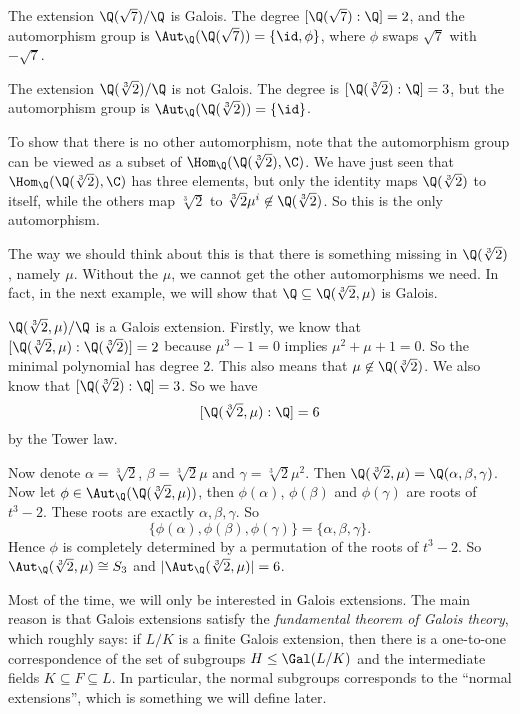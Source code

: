 \documentclass[a4paper]{article}
\begin{document}
\begin{eg}
  The extension $\Q(\sqrt{7})/\Q$ is Galois. The degree $[\Q(\sqrt{7}):\Q] = 2$, and the automorphism group is $\Aut_\Q(\Q(\sqrt{7})) = \{\id, \phi\}$, where $\phi$ swaps $\sqrt{7}$ with $-\sqrt{7}$.
\end{eg}

\begin{eg}
  The extension $\Q(\sqrt[3]{2})/\Q$ is not Galois. The degree is $[\Q(\sqrt[3]{2}):\Q] = 3$, but the automorphism group is $\Aut_\Q(\Q(\sqrt[3]{2})) = \{\id\}$.

  To show that there is no other automorphism, note that the automorphism group can be viewed as a subset of $\Hom_\Q(\Q(\sqrt[3]{2}), \C)$. We have just seen that $\Hom_\Q(\Q(\sqrt[3]{2}), \C)$ has three elements, but only the identity maps $\Q(\sqrt[3]{2})$ to itself, while the others map $\sqrt[3]{2}$ to $\sqrt[3]{2}\mu^i \not\in \Q(\sqrt[3]{2})$. So this is the only automorphism.

  The way we should think about this is that there is something missing in $\Q(\sqrt[3]{2})$, namely $\mu$. Without the $\mu$, we cannot get the other automorphisms we need. In fact, in the next example, we will show that $\Q\subseteq \Q(\sqrt[3]{2}, \mu)$ is Galois.
\end{eg}

\begin{eg}
  $\Q(\sqrt[3]{2},\mu)/\Q$ is a Galois extension. Firstly, we know that $[\Q(\sqrt[3]{2}, \mu): \Q(\sqrt[3]{2})] = 2$ because $\mu^3 - 1 = 0$ implies $\mu^2 + \mu + 1 = 0$. So the minimal polynomial has degree $2$. This also means that $\mu \not\in \Q(\sqrt[3]{2})$. We also know that $[\Q(\sqrt[3]{2}): \Q] = 3$. So we have
  \[
    [\Q(\sqrt[3]{2}, \mu): \Q] = 6
  \]
  by the Tower law.

  Now denote $\alpha = \sqrt[3]{2}$, $\beta = \sqrt[3]{2}\mu$ and $\gamma = \sqrt[3]{2}\mu^2$. Then $\Q(\sqrt[3]{2}, \mu) = \Q(\alpha, \beta, \gamma)$. Now let $\phi \in \Aut_\Q(\Q(\sqrt[3]{2}, \mu))$, then $\phi(\alpha)$, $\phi(\beta)$ and $\phi(\gamma)$ are roots of $t^3 - 2$. These roots are exactly $\alpha, \beta, \gamma$. So
  \[
    \{\phi(\alpha), \phi(\beta), \phi(\gamma)\} = \{\alpha, \beta, \gamma\}.
  \]
  Hence $\phi$ is completely determined by a permutation of the roots of $t^3 - 2$. So $\Aut_\Q(\sqrt[3]{2}, \mu) \cong S_3$ and $|\Aut_\Q(\sqrt[3]{2}, \mu)| = 6$.
\end{eg}

Most of the time, we will only be interested in Galois extensions. The main reason is that Galois extensions satisfy the \emph{fundamental theorem of Galois theory}, which roughly says: if $L/K$ is a finite Galois extension, then there is a one-to-one correspondence of the set of subgroups $H\leq \Gal(L/K)$ and the intermediate fields $K\subseteq F \subseteq L$. In particular, the normal subgroups corresponds to the ``normal extensions'', which is something we will define later.
\end{document}
